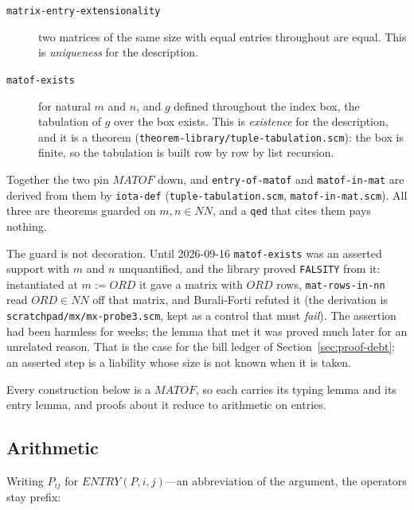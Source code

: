\begin{description}
\item[\texttt{matrix-entry-extensionality}]
  two matrices of the same size with equal entries throughout are equal.
  This is \emph{uniqueness} for the description.

\item[\texttt{matof-exists}]
  for natural $m$ and $n$, and $g$ defined throughout the index box, the
  tabulation of $g$ over the box exists.  This is \emph{existence} for
  the description, and it is a theorem
  (\texttt{theorem-library/tuple-tabulation.scm}): the box is finite, so
  the tabulation is built row by row by list recursion.
\end{description}

\noindent
Together the two pin $\mathit{MATOF}$ down, and \texttt{entry-of-matof}
and \texttt{matof-in-mat} are derived from them by \texttt{iota-def}
(\texttt{tuple-tabulation.scm}, \texttt{matof-in-mat.scm}).  All three
are theorems guarded on $m, n \in \mathit{NN}$, and a \texttt{qed} that
cites them pays nothing.

The guard is not decoration.  Until 2026-09-16 \texttt{matof-exists}
was an asserted support with $m$ and $n$ unquantified, and the library
proved \texttt{FALSITY} from it: instantiated at $m := \mathit{ORD}$ it
gave a matrix with $\mathit{ORD}$ rows, \texttt{mat-rows-in-nn} read
$\mathit{ORD} \in \mathit{NN}$ off that matrix, and Burali-Forti refuted
it (the derivation is \texttt{scratchpad/mx/mx-probe3.scm}, kept as a
control that must \emph{fail}).  The assertion had been harmless for
weeks; the lemma that met it was proved much later for an unrelated
reason.  That is the case for the bill ledger of
Section~\ref{sec:proof-debt}: an asserted step is a liability whose
size is not known when it is taken.

Every construction below is a $\mathit{MATOF}$, so each carries its
typing lemma and its entry lemma, and proofs about it reduce to
arithmetic on entries.

\subsection{Arithmetic}

Writing $P_{ij}$ for $\mathit{ENTRY}(P,i,j)$---an abbreviation of the
argument, the operators stay prefix:

